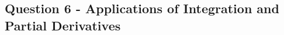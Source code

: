 \documentclass[a4paper,12pt]{article}
\begin{document}
\subsection*{Question 6 - Applications of Integration and Partial Derivatives}
%
%
%
%
%
%
%	
%
%
%
\end{document}
